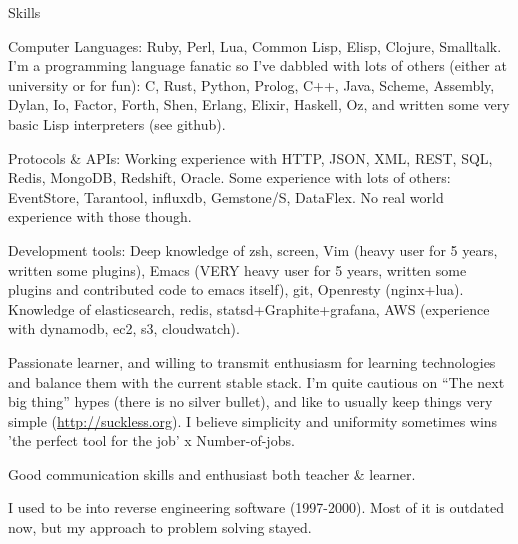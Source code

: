 \documentclass{resume} %
\begin{document}
\begin{rSection}{Skills}

\item Computer Languages: Ruby, Perl, Lua, Common Lisp, Elisp,
  Clojure, Smalltalk.  I'm a programming language fanatic so I've
  dabbled with lots of others (either at university or for fun):
  C, Rust, Python, Prolog, C++, Java, Scheme, Assembly, Dylan, Io, Factor,
  Forth, Shen, Erlang, Elixir, Haskell, Oz, and written some very
  basic Lisp interpreters (see github).

\item Protocols \& APIs: Working experience with HTTP, JSON, XML,
  REST, SQL, Redis, MongoDB, Redshift, Oracle. Some experience with
  lots of others: EventStore, Tarantool, influxdb, Gemstone/S,
  DataFlex.  No real world experience with those though.

\item Development tools: Deep knowledge of zsh, screen, Vim (heavy
  user for 5 years, written some plugins), Emacs (VERY heavy user for
  5 years, written some plugins and contributed code to emacs itself),
  git, Openresty (nginx+lua). Knowledge of elasticsearch, redis,
  statsd+Graphite+grafana, AWS (experience with dynamodb, ec2, s3,
  cloudwatch).

\item Passionate learner, and willing to transmit enthusiasm for
  learning technologies and balance them with the current stable
  stack. I'm quite cautious on ``The next big thing'' hypes (there is
  no silver bullet), and like to usually keep things very simple
  (\url{http://suckless.org}). I believe simplicity and uniformity
  sometimes wins 'the perfect tool for the job' x Number-of-jobs.

\item Good communication skills and enthusiast both teacher \& learner.

\item I used to be into reverse engineering software (1997-2000). Most
  of it is outdated now, but my approach to problem solving stayed.

\end{rSection}
\end{document}
